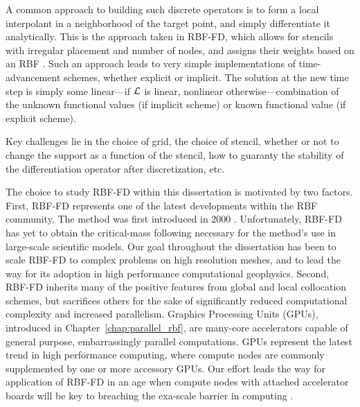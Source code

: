\documentclass[11pt]{report}
\begin{document}
{A common approach to building such discrete operators is to form a local interpolant in a neighborhood of the target point, and simply differentiate it analytically. This is the approach taken in RBF-FD,   which  allows for stencils with irregular placement and number of nodes, and assigns their weights based on an RBF \cite{Wright2003}. 
Such an approach leads to very simple implementations of time-advancement schemes, whether explicit or implicit. The solution at the new time step is simply some linear---if $\mathcal{L}$ is linear, nonlinear otherwise---combination of the unknown functional values (if implicit scheme) or known functional value (if explicit scheme). 

Key challenges lie in the choice of grid, the choice of stencil, whether or not to change the support as a function of the stencil, how to guaranty the stability of the differentiation  operator after discretization, etc. 



The choice to study RBF-FD within this dissertation is motivated by two factors. First, RBF-FD represents one of the latest developments within the RBF community. The method was first introduced in 2000 \cite{Tolstykh2000}.  Unfortunately, RBF-FD has yet to obtain the critical-mass following necessary for the method's use in large-scale scientific models. Our goal throughout the dissertation has been to scale RBF-FD to complex problems on high resolution meshes, and to lead the way for its adoption in high performance computational geophysics. Second, RBF-FD inherits many of the positive features from global and local collocation schemes, but sacrifices others for the sake of significantly reduced computational complexity and increased parallelism. Graphics Processing Units (GPUs), introduced in Chapter~\ref{chap:parallel_rbf}, are many-core accelerators capable of general purpose, embarrassingly parallel computations. GPUs represent the latest trend in high performance computing, where compute nodes are commonly supplemented by one or more accessory GPUs. %
Our effort leads the way for application of RBF-FD in an age when compute nodes with attached accelerator boards will be key to breaching the exa-scale barrier in computing \cite{GPUandExascale2011}.

}
\end{document}
